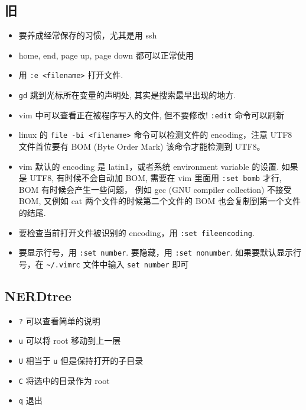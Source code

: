 \subsection{旧}
\begin{itemize}
\item 要养成经常保存的习惯，尤其是用 ssh
\item home, end, page up, page down 都可以正常使用
\item 用 \verb`:e <filename>` 打开文件.
\item \verb`gd` 跳到光标所在变量的声明处, 其实是搜索最早出现的地方.
\item vim 中可以查看正在被程序写入的文件, 但不要修改! \verb`:edit` 命令可以刷新
\item linux 的 \verb`file -bi <filename>` 命令可以检测文件的 encoding，注意 UTF8 文件首位要有 BOM (Byte Order Mark) 该命令才能检测到 UTF8。
\item vim 默认的 encoding 是 latin1，或者系统 environment variable 的设置. 如果是 UTF8, 有时候不会自动加 BOM, 需要在 vim 里面用 \verb`:set bomb` 才行, BOM 有时候会产生一些问题， 例如 gcc (GNU compiler collection) 不接受 BOM, 又例如 cat 两个文件的时候第二个文件的 BOM 也会复制到第一个文件的结尾.
\item 要检查当前打开文件被识别的 encoding，用 \verb`:set fileencoding`.
\item 要显示行号，用 \verb`:set number`. 要隐藏，用 \verb`:set nonumber`. 如果要默认显示行号，在 \verb`~/.vimrc` 文件中输入 \verb`set number` 即可
\end{itemize}

\subsection{NERDtree}
\begin{itemize}
\item \verb`?` 可以查看简单的说明
\item \verb`u` 可以将 root 移动到上一层
\item \verb`U` 相当于 \verb`u` 但是保持打开的子目录
\item \verb`C` 将选中的目录作为 root
\item \verb`q` 退出
\end{itemize}
